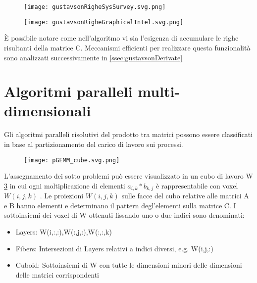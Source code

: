 \begin{figure}[h]
  \caption[pseudo-codice dell'algoritmo di Gustavson]
  \centering \texttt{[image: gustavsonRigheSysSurvey.svg.png]} \decoRule
  \label{figCode:gustavsonRigheSysSurvey}
\end{figure}
\begin{figure}[h]
  \caption[rappresentazione grafica di una iterazione dell'algoritmo di Gustavson]
  \centering \texttt{[image: gustavsonRigheGraphicalIntel.svg.png]} \decoRule
  \label{fig:gustavsonRigheGraphicalIntel}
\end{figure}
È possibile notare come nell'algoritmo vi sia l'esigenza di accumulare le righe
risultanti della matrice C. Meccanismi efficienti per realizzare questa
funzionalità sono analizzati successivamente in \ref{ssec:gustavsonDerivate} %
\\


\section{Algoritmi paralleli multi-dimensionali} 
Gli algoritmi paralleli risolutivi del prodotto tra matrici possono essere
classificati in base al partizionamento del carico di lavoro sui processi.\\
\begin{figure}[h]
  \centering \texttt{[image: pGEMM\_cube.svg.png]} 
  \caption[Rappresentazione grafica dell'assegnamento dei task per la risoluzione
      di SpGEMM in 1,2 e 3 dimensioni]\decoRule \label{fig:pGEMM_cube}
\end{figure}
L'assegnamento dei sotto problemi può essere visualizzato in un cubo di lavoro W \ref{fig:pGEMM_cube}
in cui ogni moltiplicazione di elementi \nnz $a_{i,k}*b_{k,j}$ è rappresentabile
con voxel $W(i,j,k)$ \parencite{cartesianPartitioningModels}.
Le proiezioni $W(i,j,k)$  sulle facce del cubo relative alle matrici A e B 
hanno elementi \nnz e determinano il pattern degl'elementi \nnz sulla matrice C.
\label{ch1:workCube}
I sottoinsiemi dei voxel di W ottenuti fissando uno o due indici sono denominati:
\begin{itemize}
  \item Layers: W(i,:,:),W(:,j,:),W(:,:,k)
  \item Fibers: Intersezioni di Layers relativi a indici diversi, e.g. W(i,j,:)
  \item Cuboid: Sottoinsiemi di W con tutte le dimensioni minori delle 
   dimensioni delle matrici corrispondenti
\end{itemize}

